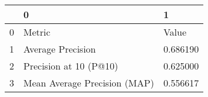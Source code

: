 \begin{tabular}{lll}
\toprule
 & 0 & 1 \\
\midrule
0 & Metric & Value \\
1 & Average Precision & 0.686190 \\
2 & Precision at 10 (P@10) & 0.625000 \\
3 & Mean Average Precision (MAP) & 0.556617 \\
\bottomrule
\end{tabular}
